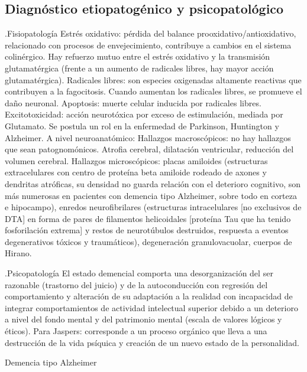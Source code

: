\documentclass{scrbook}
\begin{document}
\subsection*{Diagnóstico etiopatogénico y psicopatológico}
.Fisiopatología
Estrés oxidativo: pérdida del balance prooxidativo/antioxidativo, relacionado con procesos de envejecimiento, contribuye a cambios en el sistema colinérgico. Hay refuerzo mutuo entre el estrés oxidativo y la transmisión glutamatérgica (frente a un aumento de radicales libres, hay mayor acción glutamatérgica). Radicales libres: son especies oxigenadas altamente reactivas que contribuyen a la fagocitosis. Cuando aumentan los radicales libres, se promueve el daño neuronal. Apoptosis: muerte celular inducida por radicales libres. Excitotoxicidad: acción neurotóxica por exceso de estimulación, mediada por Glutamato. Se postula un rol en la enfermedad de Parkinson, Huntington y Alzheimer. A nivel neuroanatómico: Hallazgos macroscópicos: no hay hallazgos que sean patognomónicos. Atrofia cerebral, dilatación ventricular, reducción del volumen cerebral. Hallazgos microscópicos: placas amiloides (estructuras extracelulares con centro de proteína beta amiloide rodeado de axones y dendritas atróficas, su densidad no guarda relación con el deterioro cognitivo, son más numerosas en pacientes con demencia tipo Alzheimer, sobre todo en corteza e hipocampo), enredos neurofibrilares (estructuras intracelulares [no exclusivos de DTA] en forma de pares de filamentos helicoidales [proteína Tau que ha tenido fosforilación extrema] y restos de neurotúbulos destruidos, respuesta a eventos degenerativos tóxicos y traumáticos), degeneración granulovacuolar, cuerpos de Hirano.

.Psicopatología
El estado demencial comporta una desorganización del ser razonable (trastorno del juicio) y de la autoconducción con regresión del comportamiento y alteración de su adaptación a la realidad con incapacidad de integrar comportamientos de actividad intelectual superior debido a un deterioro a nivel del fondo mental y del patrimonio mental (escala de valores lógicos y éticos). Para Jaspers: corresponde a un proceso orgánico que lleva a una destrucción de la vida psíquica y creación de un nuevo estado de la personalidad.

Demencia tipo Alzheimer
\end{document}
